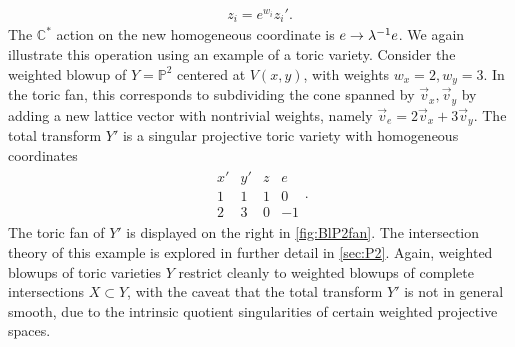 \documentclass[11pt,oneside,english]{article}
\numberwithin{equation}{section}
\renewcommand*{\to}{\mathchoice{\longrightarrow}{\rightarrow}{\rightarrow}{\rightarrow}}
\theoremstyle{definition}
\begin{document}
	\begin{align}
		z_i  = e^{w_i}  z_i'.
	\end{align}
The $\mathbb C^*$ action on the new homogeneous coordinate is $e \to \lambda^{-1} e$. We again illustrate this operation using an example of a toric variety. Consider the weighted blowup of $Y = \mathbb P^2$ centered at $V(x,y)$, with weights $w_x=2,w_y=3$. In the toric fan, this corresponds to subdividing the cone spanned by $\vec v_x, \vec v_y$ by adding a new lattice vector with nontrivial weights, namely $\vec v_e = 2 \vec v_x + 3 \vec v_y$. The total transform $ Y'$ is a singular projective toric variety with homogeneous coordinates
	\begin{align}
	\label{eqn:homcoordBl23P2}
		\begin{array}{cccc}
			 x'&y'&z&e\\\hline
			 1 & 1 & 1 & 0 \\
			2& 3 & 0& -1
		\end{array}.
	\end{align}
The toric fan of $Y'$ is displayed on the right in \cref{fig:BlP2fan}. The intersection theory of this example is explored in further detail in \cref{sec:P2}. Again, weighted blowups of toric varieties $Y$ restrict cleanly to weighted blowups of complete intersections $X \subset Y$, with the caveat that the total transform $Y'$ is not in general smooth, due to the intrinsic quotient singularities of certain weighted projective spaces.
\end{document}
